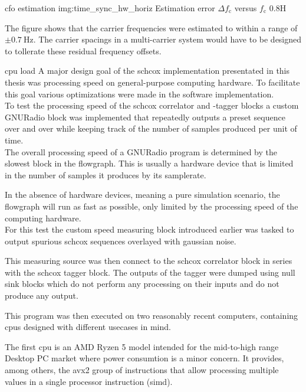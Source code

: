 \begin{subchapter}{\Acrlong{cfo} estimation}
                  {img:time_sync_hw_horiz}
                  {Estimation error $\Delta f_\text{c}$ versus $f_\text{c}$}
                  {0.8}{H}

  The figure shows that the carrier frequencies were
  estimated to within a range of $\pm\SI{0.7}{\hertz}$.
  The carrier spacings in a multi-carrier system
  would have to be designed to tollerate these residual
  frequency offsets.
\end{subchapter}

\begin{subchapter}{\Acrshort{cpu} load}
  A major design goal of the \gls{schcox} implementation
  presentated in this thesis was processing speed on
  general-purpose computing hardware.
  To facilitate this goal various optimizations were
  made in the software implementation. \\

  To test the processing speed of the
  \gls{schcox} correlator and -tagger blocks
  a custom GNURadio block was implemented that repeatedly outputs
  a preset sequence over and over while keeping
  track of the number of samples produced per unit of time. \\

  The overall processing speed of a GNURadio program
  is determined by the slowest block in the flowgraph.
  This is usually a hardware device that is limited in
  the number of samples it produces by its samplerate.

  In the absence of hardware devices, meaning a pure
  simulation scenario, the flowgraph will run as fast
  as possible, only limited by the processing speed
  of the computing hardware. \\

  For this test the custom speed measuring block
  introduced earlier was tasked to output spurious
  \gls{schcox} sequences overlayed with gaussian noise.

  This measuring source was then connect to the
  \gls{schcox} correlator block in series with
  the \gls{schcox} tagger block.
  The outputs of the tagger were dumped using
  null sink blocks which do not perform any processing
  on their inputs and do not produce any output.

  This program was then executed on two reasonably
  recent computers, containing \glspl{cpu} designed
  with different usecases in mind.

  The first \gls{cpu} is an AMD Ryzen 5 model intended
  for the mid-to-high range Desktop PC market where power
  consumtion is a minor concern.
  It provides, among others, the \acrshort{avx2} group of instructions
  that allow processing multiple values in a single processor
  instruction (\acrshort{simd}).


\end{subchapter}
